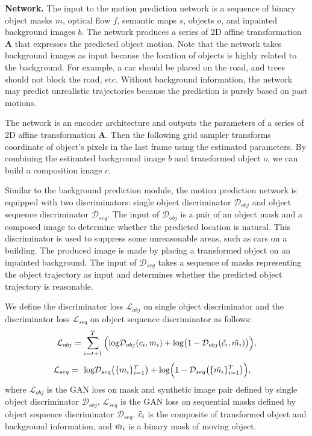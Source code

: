 \documentclass[10pt,twocolumn,letterpaper]{article}
\begin{document}
\vspace{2mm}
\noindent\textbf{Network.}
The input to the motion prediction network is a sequence of binary object masks $m$, optical flow $f$, semantic maps $s$, objects $o$, and inpainted background images $b$. The network produces a series of 2D affine transformation $\mathbf{A}$ that expresses the predicted object motion. Note that the network takes background images as input because the location of objects is highly related to the background. For example, a car should be placed on the road, and trees should not block the road, etc. Without background information, the network may predict unrealistic trajectories because the prediction is purely based on past motions.

The network is an encoder architecture and outputs the parameters of a series of 2D affine transformation $\mathbf{A}$. 
Then the following grid sampler transforms coordinate of object's pixels in the last frame using the estimated parameters. By combining the estimated background image $b$ and transformed object $o$, we can build a composition image $c$.


Similar to the background prediction module, the motion prediction network is equipped with two discriminators: single object discriminator $\mathcal{D}_{obj}$ and object sequence discriminator $\mathcal{D}_{seq}$.
The input of $\mathcal{D}_{obj}$ is a pair of an object mask and a composed image to determine whether the predicted location is natural. This discriminator is used to suppress some unreasonable areas, such as cars on a building. The produced image is made by placing a transformed object on an inpainted background. The input of $\mathcal{D}_{seq}$ takes a sequence of masks representing the object trajectory as input and determines whether the predicted object trajectory is reasonable.



We define the discriminator loss $\mathcal{L}_{obj}$ on single object discriminator and the discriminator loss $\mathcal{L}_{seq}$ on object sequence discriminator as follows:
\begin{equation}
    \mathcal{L}_{obj}=\sum_{i=t+1}^{T}\Big(\mathrm{log} \mathcal{D}_{obj}(c_i, m_i) + \mathrm{log}\big(1 - \mathcal{D}_{obj}(\Tilde{c_i}, \Tilde{m_i})\big)\Big),
\end{equation}
\begin{align}
    \mathcal{L}_{seq}=~&~\mathrm{log}\mathcal{D}_{seq}\big(\{m_i\}_{i=1}^{T}\big)+\mathrm{log}\Big(1-\mathcal{D}_{seq}\big(\{\Tilde{m_i}\}_{i=1}^{T}\big)\Big),
\end{align}
where $\mathcal{L}_{obj}$ is the GAN loss on mask and synthetic image pair defined by single object discriminator $\mathcal{D}_{obj}$, $\mathcal{L}_{seq}$ is the GAN loss on sequential masks defined by object sequence discriminator $\mathcal{D}_{seq}$. $\Tilde{c}_i$ is the composite of transformed object and background information, and $\Tilde{m}_i$ is a binary mask of moving object.
\end{document}
